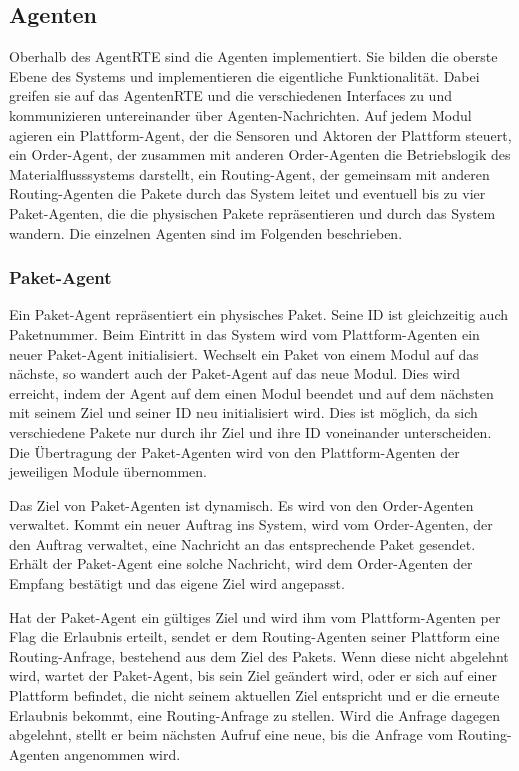 \subsection{Agenten}
Oberhalb des AgentRTE sind die Agenten implementiert. Sie bilden die oberste Ebene des Systems und implementieren die eigentliche Funktionalität. Dabei greifen sie auf das AgentenRTE und die verschiedenen Interfaces zu und kommunizieren untereinander über Agenten-Nachrichten. Auf jedem Modul agieren ein Plattform-Agent, der die Sensoren und Aktoren der Plattform steuert, ein Order-Agent, der zusammen mit anderen Order-Agenten die Betriebslogik des Materialflusssystems darstellt, ein Routing-Agent, der gemeinsam mit anderen Routing-Agenten die Pakete durch das System leitet und eventuell bis zu vier Paket-Agenten, die die physischen Pakete repräsentieren und durch das System wandern. Die einzelnen Agenten sind im Folgenden beschrieben.
\subsubsection{Paket-Agent}
Ein Paket-Agent repräsentiert ein physisches Paket. Seine ID ist gleichzeitig auch Paketnummer. Beim Eintritt in das System wird vom Plattform-Agenten ein neuer Paket-Agent initialisiert. Wechselt ein Paket von einem Modul auf das nächste, so wandert auch der Paket-Agent auf das neue Modul. Dies wird erreicht, indem der Agent auf dem einen Modul beendet und auf dem nächsten mit seinem Ziel und seiner ID neu initialisiert wird. Dies ist möglich, da sich verschiedene Pakete nur durch ihr Ziel und ihre ID voneinander unterscheiden. Die Übertragung der Paket-Agenten wird von den Plattform-Agenten der jeweiligen Module übernommen.

Das Ziel von Paket-Agenten ist dynamisch. Es wird von den Order-Agenten verwaltet. Kommt ein neuer Auftrag ins System, wird vom Order-Agenten, der den Auftrag verwaltet, eine Nachricht an das entsprechende Paket gesendet. Erhält der Paket-Agent eine solche Nachricht, wird dem Order-Agenten der Empfang bestätigt und das eigene Ziel wird angepasst.

Hat der Paket-Agent ein gültiges Ziel und wird ihm vom Plattform-Agenten per Flag die Erlaubnis erteilt, sendet er dem Routing-Agenten seiner Plattform eine Routing-Anfrage, bestehend aus dem Ziel des Pakets. Wenn diese nicht abgelehnt wird, wartet der Paket-Agent, bis sein Ziel geändert wird, oder er sich auf einer Plattform befindet, die nicht seinem aktuellen Ziel entspricht und er die erneute Erlaubnis bekommt, eine Routing-Anfrage zu stellen. Wird die Anfrage dagegen abgelehnt, stellt er beim nächsten Aufruf eine neue, bis die Anfrage vom Routing-Agenten angenommen wird.

